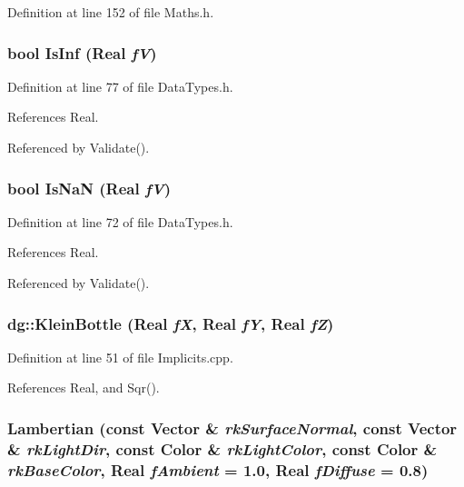 Definition at line 152 of file Maths.h.
\subsubsection{\setlength{\rightskip}{0pt plus 5cm}bool Is\-Inf ({\bf Real} {\em f\-V})\hspace{0.3cm}{\tt  [inline]}}\label{namespacedg_a64}




Definition at line 77 of file Data\-Types.h.

References Real.

Referenced by Validate().
\subsubsection{\setlength{\rightskip}{0pt plus 5cm}bool Is\-Na\-N ({\bf Real} {\em f\-V})\hspace{0.3cm}{\tt  [inline]}}\label{namespacedg_a63}




Definition at line 72 of file Data\-Types.h.

References Real.

Referenced by Validate().
\subsubsection{ dg::Klein\-Bottle ({\bf Real} {\em f\-X}, {\bf Real} {\em f\-Y}, {\bf Real} {\em f\-Z})}\label{namespacedg_a75}




Definition at line 51 of file Implicits.cpp.

References Real, and Sqr().
\subsubsection{ Lambertian (const {\bf Vector} \& {\em rk\-Surface\-Normal}, const {\bf Vector} \& {\em rk\-Light\-Dir}, const {\bf Color} \& {\em rk\-Light\-Color}, const {\bf Color} \& {\em rk\-Base\-Color}, {\bf Real} {\em f\-Ambient} = 1.0, {\bf Real} {\em f\-Diffuse} = 0.8)\hspace{0.3cm}{\tt  [inline]}}\label{namespacedg_a175}




